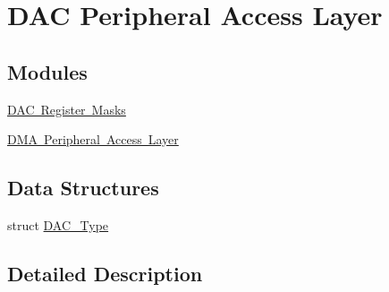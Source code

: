 \hypertarget{group___d_a_c___peripheral___access___layer}{}\section{D\+AC Peripheral Access Layer}
\label{group___d_a_c___peripheral___access___layer}
\subsection*{Modules}
\begin{DoxyCompactItemize}
\item 
\mbox{\hyperlink{group___d_a_c___register___masks}{D\+A\+C Register Masks}}
\item 
\mbox{\hyperlink{group___d_m_a___peripheral___access___layer}{D\+M\+A Peripheral Access Layer}}
\end{DoxyCompactItemize}
\subsection*{Data Structures}
\begin{DoxyCompactItemize}
\item 
struct \mbox{\hyperlink{struct_d_a_c___type}{D\+A\+C\+\_\+\+Type}}
\end{DoxyCompactItemize}


\subsection{Detailed Description}
